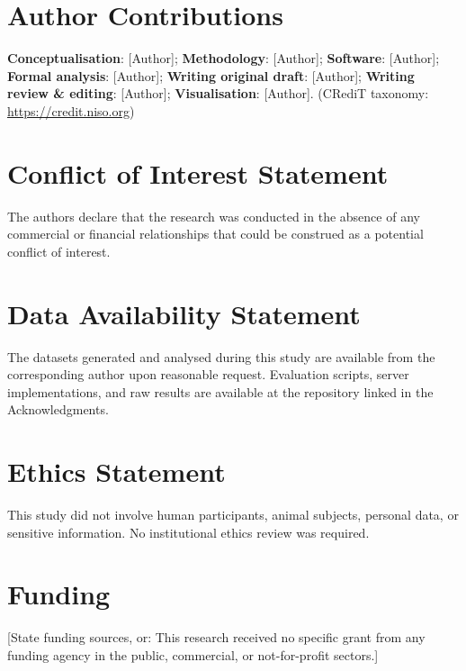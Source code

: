 \documentclass[journal]{IEEEtran}
\begin{document}
\section*{Author Contributions}
\textbf{Conceptualisation}: [Author]; \textbf{Methodology}: [Author];
\textbf{Software}: [Author]; \textbf{Formal analysis}: [Author];
\textbf{Writing original draft}: [Author];
\textbf{Writing review \& editing}: [Author];
\textbf{Visualisation}: [Author].
(CRediT taxonomy: \url{https://credit.niso.org})

\section*{Conflict of Interest Statement}
The authors declare that the research was conducted in the absence of any
commercial or financial relationships that could be construed as a potential
conflict of interest.

\section*{Data Availability Statement}
The datasets generated and analysed during this study are available from the
corresponding author upon reasonable request. Evaluation scripts, server
implementations, and raw results are available at the repository linked in the
Acknowledgments.

\section*{Ethics Statement}
This study did not involve human participants, animal subjects, personal data,
or sensitive information. No institutional ethics review was required.

\section*{Funding}
[State funding sources, or: This research received no specific grant from any
funding agency in the public, commercial, or not-for-profit sectors.]

\balance
\end{document}
